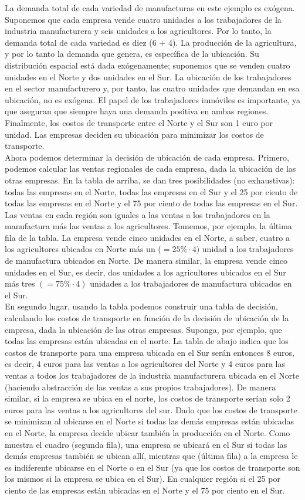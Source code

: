 La demanda total de cada variedad de manufacturas en este ejemplo es exógena. Suponemos que cada empresa vende cuatro unidades a los trabajadores de la industria manufacturera y seis unidades a los agricultores. Por lo tanto, la demanda total de cada variedad es diez (6 + 4). La producción de la agricultura, y por lo tanto la demanda que genera, es específica de la ubicación. Su distribución espacial está dada exógenamente; suponemos que se venden cuatro unidades en el Norte y dos unidades en el Sur. La ubicación de los trabajadores en el sector manufacturero y, por tanto, las cuatro unidades que demandan en esa ubicación, no es exógena. El papel de los trabajadores inmóviles es importante, ya que aseguran que siempre haya una demanda positiva en ambas regiones. Finalmente, los costos de transporte entre el Norte y el Sur son 1 euro por unidad. Las empresas deciden su ubicación para minimizar los costos de transporte.\\
Ahora podemos determinar la decisión de ubicación de cada empresa. Primero, podemos calcular las ventas regionales de cada empresa, dada la ubicación de las otras empresas. En la tabla de arriba, se dan tres posibilidades (no exhaustivas): todas las empresas en el Norte, todas las empresas en el Sur y el 25 por ciento de todas las empresas en el Norte y el 75 por ciento de todas las empresas en el Sur. Las ventas en cada región son iguales a las ventas a los trabajadores en la manufactura más las ventas a los agricultores. Tomemos, por ejemplo, la última fila de la tabla.  La empresa vende cinco unidades en el Norte, a saber, cuatro a los agricultores ubicados en Norte más un ($ = 25\% · 4)$ unidad a los trabajadores de manufactura ubicados en Norte. De manera similar, la empresa vende cinco unidades en el Sur, es decir, dos unidades a los agricultores ubicados en el Sur más tres $( = 75\% · 4)$ unidades a los trabajadores de manufactura ubicados en el Sur.\\
En segundo lugar, usando la tabla podemos construir una tabla de decisión, calculando los costos de transporte en función de la decisión de ubicación de la empresa, dada la ubicación de las otras empresas. Suponga, por ejemplo, que todas las empresas están ubicadas en el norte. La tabla de abajo indica que los costos de transporte para una empresa ubicada en el Sur serán entonces 8 euros, es decir, 4 euros para las ventas a los agricultores del Norte y 4 euros para las ventas a todos los trabajadores de la industria manufacturera ubicada en el Norte (haciendo abstracción de las ventas a sus propios trabajadores). De manera similar, si la empresa se ubica en el norte, los costos de transporte serían solo 2 euros para las ventas a los agricultores del sur. Dado que los costos de transporte se minimizan al ubicarse en el Norte si todas las demás empresas están ubicadas en el Norte, la empresa decide ubicar también la producción en el Norte. Como muestra el cuadro  (segunda fila), una empresa se ubicará en el Sur si todas las demás empresas también se ubican allí, mientras que (última fila) a la empresa le es indiferente ubicarse en el Norte o en el Sur (ya que los costos de transporte son los mismos si la empresa se ubica en el Sur). En cualquier región si el 25 por ciento de las empresas están ubicadas en el Norte y el 75 por ciento en el Sur.

